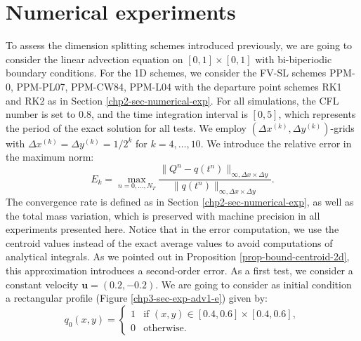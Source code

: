 \newpage
\section{Numerical experiments}
\label{sec-ds-exp}
To assess the dimension splitting schemes introduced previously, 
we are going to consider the linear advection equation on $[0,1]\times[0,1]$ 
with bi-biperiodic boundary conditions.
For the 1D schemes, we consider the FV-SL schemes PPM-0, PPM-PL07, PPM-CW84, PPM-L04
with the departure point schemes RK1 and RK2 as in Section \ref{chp2-sec-numerical-exp}.
For all simulations, the CFL number is set to $0.8$, and the time integration interval 
is $[0,5]$, which represents the period of the exact solution for all tests.
We employ $(\Delta x^{(k)},\Delta y^{(k)})$-grids with $\Delta x^{(k)} = \Delta y^{(k)} = 1/2^k$ for $k=4, \ldots, 10$.
We introduce the relative error in the maximum norm:
\begin{equation*}
	E_k = \max_{n=0,\ldots, N_T}
	\frac{\| Q^n - q(t^n) \|_{\infty, \Delta x \times \Delta y}}
	{\|q(t^n)\|_{\infty, \Delta x \times \Delta y}}.
\end{equation*}
The convergence rate is defined as in Section \ref{chp2-sec-numerical-exp}, 
as well as the total mass variation, which is preserved with machine precision
in all experiments presented here.
Notice that in the error computation, we use the centroid values instead
of the exact average values to avoid computations of analytical integrals.
As we pointed out in Proposition \ref{prop-bound-centroid-2d}, this approximation introduces a second-order error.
As a first test, we consider a constant velocity $\boldsymbol{u}=(0.2,-0.2)$.
We are going to consider as initial condition a rectangular profile
(Figure \ref{chp3-sec-exp-adv1-e}) given by:
\begin{equation}
	\label{chp3-ic1}
	q_0(x,y) =  
	\begin{cases}
		1 & \text{if } (x,y) \in [0.4,0.6]\times [0.4,0.6],\\
		0 & \text{otherwise}.
	\end{cases}
\end{equation}

